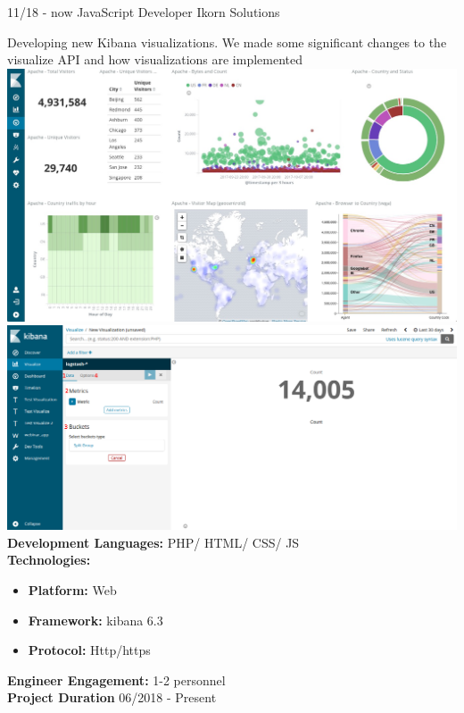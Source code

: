 \documentclass[]{friggeri-cv}
\begin{document}
\begin{entrylist}
  \entry
    {11/18 - now}
    {JavaScript Developer}
    {Ikorn Solutions}
    {Developing new Kibana visualizations. We made some significant changes to the visualize API and how visualizations are implemented\\

	\includegraphics[scale=0.08]{img/kibana_01.jpg} \hspace{2cm}
	\includegraphics[scale=0.1]{img/kibana.png}\\
	
	\textbf{Development Languages:} PHP/ HTML/ CSS/ JS~\\
	 \textbf{Technologies:}~
			\begin{itemize}
				\item \textbf{Platform:}  Web
				\item \textbf{Framework:} kibana 6.3
				\item \textbf{Protocol:} Http/https
			\end{itemize}
	 \textbf{Engineer Engagement:} 1-2 personnel\\
	 \textbf{Project Duration} 06/2018 - Present~
     }
\end{entrylist}
\end{document}
